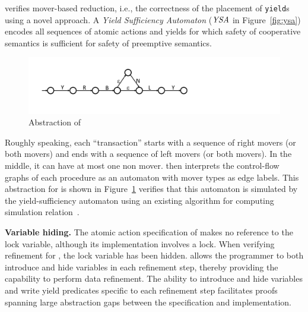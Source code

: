 \civl verifies mover-based reduction, i.e., the correctness of the placement of {\tt yield}s using a novel  approach.
A {\em Yield Sufficiency Automaton\/} ($\mathit{YSA}$ in Figure~\ref{fig:ysa}) encodes all sequences of atomic actions and yields for which safety of cooperative semantics is sufficient 
for safety of preemptive semantics. 
\begin{figure}
\begin{center}
\includegraphics[scale=0.25]{WBSlow.pdf}
\end{center}
\caption{Abstraction of }
\label{fig:midwb}
\end{figure}
Roughly speaking, each ``transaction'' starts with a sequence of right movers (or both movers) and ends with a sequence of left movers (or both movers).
In the middle, it can have at most one non mover.
\civl then interprets the control-flow graphs of each procedure as an automaton with mover types as edge labels. 
This abstraction for  is shown in Figure~\ref{fig:midwb}
\civl verifies that this automaton is simulated by the yield-sufficiency automaton using an existing algorithm for computing simulation relation~\cite{HenzingerHK95}.

{\bf Variable hiding.}
The atomic action specification of  makes no reference to the lock variable, although its implementation involves a lock. 
When verifying refinement for , the lock variable has been hidden. 
\civl allows the programmer to both introduce and hide variables in
each refinement step, thereby providing the capability to perform data refinement.
The ability to introduce and hide variables and write yield predicates specific to each refinement step 
facilitates proofs spanning large abstraction gaps between the specification and implementation.

%

